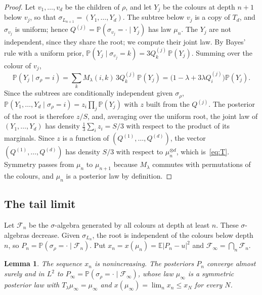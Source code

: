 \documentclass[11pt]{amsart}
\newtheorem{lemma}[theorem]{Lemma}
\theoremstyle{definition}
\theoremstyle{remark}
\newcommand{\E}{\mathbb{E}}
\newcommand{\PP}{\mathbb{P}}
\begin{document}
\begin{proof}
Let $v_1,\dots,v_d$ be the children of $\rho$, and let $Y_j$ be the colours at depth $n+1$ below $v_j$, so
that $\sigma_{L_{n+1}}=(Y_1,\dots,Y_d)$. The subtree below $v_j$ is a copy of $T_d$, and $\sigma_{v_j}$ is
uniform; hence $Q^{(j)}=\PP(\sigma_{v_j}=\cdot\mid Y_j)$ has law $\mu_n$. The $Y_j$ are not independent,
since they share the root; we compute their joint law. By Bayes' rule with a uniform prior,
$\PP(Y_j\mid\sigma_{v_j}=k)=3Q^{(j)}_k\,\PP(Y_j)$. Summing over the colour of $v_j$,
\[
\PP(Y_j\mid\sigma_\rho=i)=\sum_k M_\lambda(i,k)\,3Q^{(j)}_k\,\PP(Y_j)
=\big(1-\lambda+3\lambda Q^{(j)}_i\big)\PP(Y_j).
\]
Since the subtrees are conditionally independent given $\sigma_\rho$,
$\PP(Y_1,\dots,Y_d\mid\sigma_\rho=i)=z_i\prod_j\PP(Y_j)$ with $z$ built from the $Q^{(j)}$. The posterior of
the root is therefore $z/S$, and, averaging over the uniform root, the joint law of $(Y_1,\dots,Y_d)$ has
density $\tfrac13\sum_i z_i=S/3$ with respect to the product of its marginals. Since $z$ is a function of
$(Q^{(1)},\dots,Q^{(d)})$, the vector $(Q^{(1)},\dots,Q^{(d)})$ has density $S/3$ with respect to
$\mu_n^{\otimes d}$, which is~\eqref{eq:T}. Symmetry passes from $\mu_n$ to $\mu_{n+1}$ because
$M_\lambda$ commutes with permutations of the colours, and $\mu_n$ is a posterior law by definition.
\end{proof}

\subsection{The tail limit}
Let $\mathcal F_n$ be the $\sigma$-algebra generated by all colours at depth at least $n$. These
$\sigma$-algebras decrease. Given $\sigma_{L_n}$, the root is independent of the colours below depth $n$, so
$P_n=\PP(\sigma_\rho=\cdot\mid\mathcal F_n)$. Put $x_n=x(\mu_n)=\E|P_n-u|^2$ and
$\mathcal F_\infty=\bigcap_n\mathcal F_n$.

\begin{lemma}\label{lem:tail}
The sequence $x_n$ is nonincreasing. The posteriors $P_n$ converge almost surely and in $L^2$ to
$P_\infty=\PP(\sigma_\rho=\cdot\mid\mathcal F_\infty)$, whose law $\mu_\infty$ is a symmetric posterior law
with $T_\lambda\mu_\infty=\mu_\infty$ and $x(\mu_\infty)=\lim_n x_n\le x_N$ for every $N$.
\end{lemma}
\end{document}
